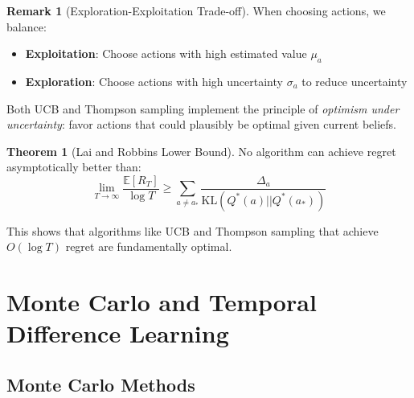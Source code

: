 \documentclass[12pt,a4paper]{article}
\theoremstyle{definition}
\newtheorem{theorem}{Theorem}[section]
\newtheorem{remark}{Remark}[section]
\begin{document}
\begin{remark}[Exploration-Exploitation Trade-off]
When choosing actions, we balance:
\begin{itemize}
    \item \textbf{Exploitation}: Choose actions with high estimated value $\mu_a$
    \item \textbf{Exploration}: Choose actions with high uncertainty $\sigma_a$ to reduce uncertainty
\end{itemize}

Both UCB and Thompson sampling implement the principle of \textit{optimism under uncertainty}: favor actions that could plausibly be optimal given current beliefs.
\end{remark}

\begin{theorem}[Lai and Robbins Lower Bound]
No algorithm can achieve regret asymptotically better than:
\[
\lim_{T \to \infty} \frac{\mathbb{E}[R_T]}{\log T} \geq \sum_{a \neq a_*} \frac{\Delta_a}{\text{KL}(Q^*(a) || Q^*(a_*))}
\]

This shows that algorithms like UCB and Thompson sampling that achieve $O(\log T)$ regret are fundamentally optimal.
\end{theorem}

\section{Monte Carlo and Temporal Difference Learning}

\subsection{Monte Carlo Methods}
\end{document}
